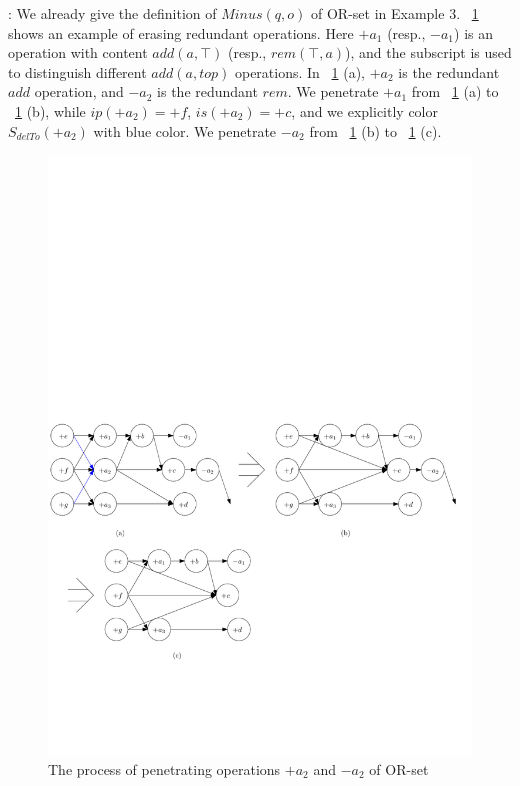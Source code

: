 : We already give the definition of $Minus(q,o)$ of OR-set in Example 3. \figurename~\ref{fig:the process of penetrate operations of or-set} shows an example of erasing redundant operations. Here $+a_1$ (resp., $-a_1$) is an operation with content $add(a,\top)$ (resp., $rem(\top,a)$), and the subscript is used to distinguish different $add(a,top)$ operations. In \figurename~\ref{fig:the process of penetrate operations of or-set} (a), $+a_2$ is the redundant $add$ operation, and $-a_2$ is the redundant $rem$. We penetrate $+a_1$ from \figurename~\ref{fig:the process of penetrate operations of or-set} (a) to \figurename~\ref{fig:the process of penetrate operations of or-set} (b), while $ip(+a_2) = +f$, $is(+a_2) = +c$, and we explicitly color $S_{delTo}(+a_2)$ with blue color.  We penetrate $-a_2$ from \figurename~\ref{fig:the process of penetrate operations of or-set} (b) to \figurename~\ref{fig:the process of penetrate operations of or-set} (c).


\begin{figure}[t]
  \centering
  \includegraphics[width=0.85 \textwidth]{figures/PIC-Example-CompactProcess.pdf}
  \caption{The process of penetrating operations $+a_2$ and $-a_2$ of OR-set}
  \label{fig:the process of penetrate operations of or-set}
\end{figure}

